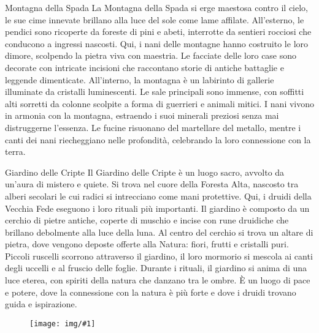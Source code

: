 \documentclass[letterpaper,twocolumn,openany,nodeprecatedcode]{dndbook}
\newcommand{\image}[3]{%
  \begin{figure}[#3]
    \begin{tcolorbox}[
        enhanced,
        colframe=PhbTan,
        colback=white,
        opacityback=0,
        title={\vspace{0.2cm}\centering \sc  \textbf{#2}\vspace{0.2cm}},
        colbacktitle=PhbTan!50!PhbLightCyan,
        coltitle=black,
        fonttitle=\bfseries
    ]
    \texttt{[image: img/\#1]}
    \end{tcolorbox}
  \end{figure}
}
\begin{document}
\begingroup
\DndSetThemeColor[PhbMauve]
\begin{DndComment}{Montagna della Spada}
  \justifying
La Montagna della Spada si erge maestosa contro il cielo, le sue cime innevate brillano alla luce del sole come lame affilate. All’esterno, le pendici sono ricoperte da foreste di pini e abeti, interrotte da sentieri rocciosi che conducono a ingressi nascosti. Qui, i nani delle montagne hanno costruito le loro dimore, scolpendo la pietra viva con maestria. Le facciate delle loro case sono decorate con intricate incisioni che raccontano storie di antiche battaglie e leggende dimenticate. All’interno, la montagna è un labirinto di gallerie illuminate da cristalli luminescenti. Le sale principali sono immense, con soffitti alti sorretti da colonne scolpite a forma di guerrieri e animali mitici. I nani vivono in armonia con la montagna, estraendo i suoi minerali preziosi senza mai distruggerne l’essenza. Le fucine risuonano del martellare del metallo, mentre i canti dei nani riecheggiano nelle profondità, celebrando la loro connessione con la terra.
\end{DndComment}

\begin{DndComment}{Giardino delle Cripte}
  \justifying
Il Giardino delle Cripte è un luogo sacro, avvolto da un’aura di mistero e quiete. Si trova nel cuore della Foresta Alta, nascosto tra alberi secolari le cui radici si intrecciano come mani protettive. Qui, i druidi della Vecchia Fede eseguono i loro rituali più importanti. Il giardino è composto da un cerchio di pietre antiche, coperte di muschio e incise con rune druidiche che brillano debolmente alla luce della luna. Al centro del cerchio si trova un altare di pietra, dove vengono deposte offerte alla Natura: fiori, frutti e cristalli puri. Piccoli ruscelli scorrono attraverso il giardino, il loro mormorio si mescola ai canti degli uccelli e al fruscio delle foglie. Durante i rituali, il giardino si anima di una luce eterea, con spiriti della natura che danzano tra le ombre. È un luogo di pace e potere, dove la connessione con la natura è più forte e dove i druidi trovano guida e ispirazione.
\end{DndComment}

\image{rune.jpeg}{Rune del Giardino delle Cripte}{h!}
\end{document}
